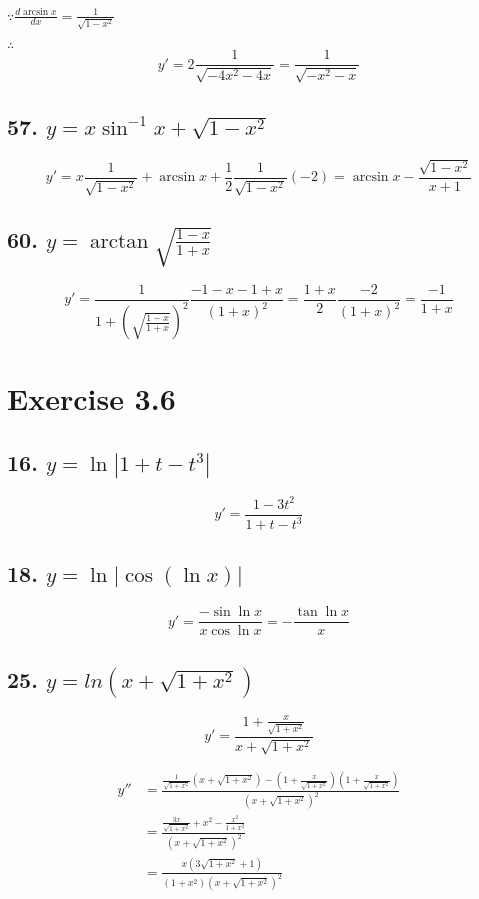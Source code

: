 \documentclass{article}
\begin{document}
    $\because \frac{d \arcsin x}{dx} = \frac{1}{\sqrt{1 - x^2}}$

    $\therefore$ $$y' = 2\frac{1}{\sqrt{- 4x^2 - 4x}} = \frac{1}{\sqrt{-x^2 - x}}$$

    \subsection*{57. $y = x\sin^{-1}x + \sqrt{1 - x^2}$}

    $$y' = x\frac{1}{\sqrt{1 - x^2}} + \arcsin x + \frac 1 2 \frac{1}{\sqrt{1 - x^2}}(-2) = \arcsin x - \frac{\sqrt{1 - x^2}}{x + 1}$$

    \subsection*{60. $y = \arctan \sqrt{\frac {1 - x}{1 + x}}$}

    $$y' = \frac{1}{1 + (\sqrt{\frac{1 - x}{1 + x}})^2} \frac{-1 - x - 1 + x}{(1 + x)^2} = \frac{1 + x}{2} \frac{-2}{(1 + x)^2} = \frac{-1}{1 + x}$$

    \section*{Exercise 3.6}

    \subsection*{16. $y = \ln|1 + t - t^3|$}

    $$y' = \frac{1 - 3t^2}{1 + t - t^3}$$

    \subsection*{18. $y = \ln |\cos (\ln x)|$}

    $$y' = \frac{-\sin \ln x }{x\cos \ln x} = -\frac{\tan \ln x}{x}$$

    \subsection*{25. $y = ln(x + \sqrt{1 + x^2})$}

    $$y' = \frac{1 + \frac{x}{\sqrt{1 + x^2}}}{x + \sqrt{1 + x^2}}$$

    $$\begin{aligned}
        y'' &= \frac{\frac{1}{\sqrt{1 + x^2}} (x + \sqrt{1 + x^2}) - (1 + \frac{x}{\sqrt{1 + x^2}})(1 + \frac{x}{\sqrt{1 + x^2}})}{(x + \sqrt{1 + x^2})^2} \\
        &= \frac{\frac{3x}{\sqrt{1 + x^2}} + x^2 - \frac{x^2}{1 + x^2} }{(x + \sqrt{1 + x^2})^2} \\
        &= \frac{x(3\sqrt{1 + x^2} + 1)}{(1 + x^2)(x + \sqrt{1 + x^2}) ^2}
    \end{aligned}$$
\end{document}
